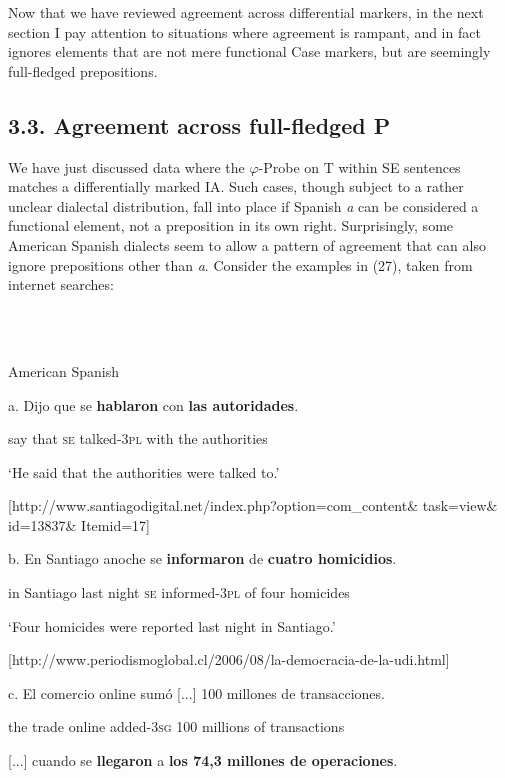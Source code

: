 \documentclass[output=paper]{langsci/langscibook}
\begin{document}
  Now that we have reviewed agreement across differential markers, in the next section I pay attention to situations where agreement is rampant, and in fact ignores elements that are not mere functional Case markers, but are seemingly full-fledged prepositions.

\subsection{ 3.3. Agreement across full-fledged P}

We have just discussed data where the $\varphi $-Probe on T within SE sentences matches a differentially marked IA. Such cases, though subject to a rather unclear dialectal distribution, fall into place if Spanish \textit{a} can be considered a functional element, not a preposition in its own right. Surprisingly, some American Spanish dialects seem to allow a pattern of agreement that can also ignore prepositions other than \textit{a}. Consider the examples in (27), taken from internet searches:

\ea%
    \label{ex:key:27}
    \gll\\
        \\
    \glt
    \z

          American Spanish

a.   Dijo que se  \textbf{hablaron}    con   \textbf{las   autoridades}.

                  say  that \textsc{se}   talked-\textsc{3pl}  with  the  authorities

‘He said that the authorities were talked to.’

[http://www.santiagodigital.net/index.php?option=com\_content\& task=view\& id=13837\& Itemid=17]

b.  En Santiago anoche    se  \textbf{informaron}   de \textbf{cuatro  homicidios}.

in  Santiago last night \textsc{se}   informed-\textsc{3pl} of  four     homicides

‘Four homicides were reported last night in Santiago.’

[http://www.periodismoglobal.cl/2006/08/la-democracia-de-la-udi.html]

c.   El  comercio online sumó [...]   100 millones de transacciones.  

the trade       online added{}-\textsc{3sg} 100 millions  of transactions

[...] cuando se   \textbf{llegaron}       a   \textbf{los 74,3 millones  de operaciones}.
\end{document}
